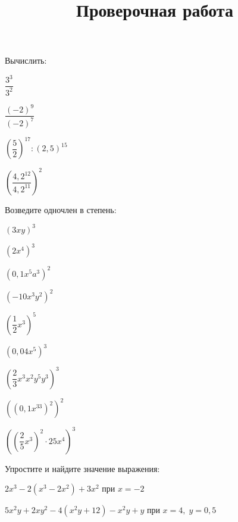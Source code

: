 \begin{listofex}
\begin{enumcols}[itemcolumns=2]
	\end{enumcols}
	\item Вычислить:
	\begin{enumcols}[itemcolumns=4]
		\item \( \dfrac{3^3}{3^2} \)
		\item \( \dfrac{(-2)^9}{(-2)^7} \)
		\item \( \left( \dfrac{5}{2} \right)^{17}:\left( 2,5 \right)^{15} \)
		\item \( \left( \dfrac{4,2^{12}}{4,2^{11}} \right)^2 \)
	\end{enumcols}
	\item Возведите одночлен в степень:
	\begin{enumcols}[itemcolumns=4]
		\item \( (3xy)^3 \)
		\item \( (2x^4)^3 \)
		\item \( (0,1x^5a^3)^2 \)
		\item \( (-10x^3y^2)^2 \)
		\item \( \left( \dfrac{1}{2}x^3 \right)^5 \)
		\item \( (0,04x^5)^3 \)
		\item \( \left( \dfrac{2}{3}x^3x^2y^5y^3 \right)^3 \)
		\item \( \left( \left( 0,1x^{33} \right)^2 \right)^2 \)
		\item \( \left( \left( \dfrac{2}{5}x^3 \right)^2\cdot25x^4 \right)^3 \)
	\end{enumcols}
	\item Упростите и найдите значение выражения:
	\begin{enumcols}[itemcolumns=1]
		\item \( 2x^3-2(x^3-2x^2)+3x^2 \) при \( x=-2 \)
		\item \( 5x^2y+2xy^2-4(x^2y+12)-x^2y+y\) при \( x=4,\;y=0,5 \)
	\end{enumcols}
\end{listofex}
\newpage
\title{Проверочная работа}
